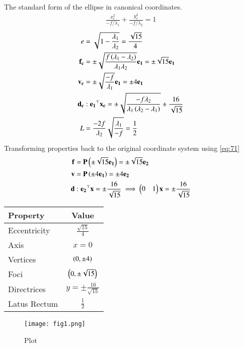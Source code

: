\documentclass[journal]{IEEEtran}
\begin{document}
The standard form of the ellipse in canonical coordinates.
\begin{align}
    \frac{x_c^2}{-f/\lambda_1} + \frac{y_c^2}{-f/\lambda_2} = 1
\end{align}
\begin{align}
    e &= \sqrt{1 - \frac{\lambda_1}{\lambda_2}} = \frac{\sqrt{15}}{4} \\
    \mathbf{f_c} &= \pm\sqrt{\frac{f\left(\lambda_1 - \lambda_2\right)}{\lambda_1\lambda_2}}\mathbf{e_1} = \pm\sqrt{15}\mathbf{e_1} \\
    \mathbf{v_c} &= \pm\sqrt{\frac{-f}{\lambda_1}}\mathbf{e_1} = \pm 4\mathbf{e_1} \\
    \mathbf{d_c} &: \mathbf{e_1}^\top\mathbf{x_c} = \pm\sqrt{\frac{-f\lambda_2}{\lambda_1\left(\lambda_2-\lambda_1\right)}} \pm\frac{16}{\sqrt{15}} \\
    L &= \frac{-2f}{\lambda_2}\sqrt{\frac{\lambda_1}{-f}} = \frac{1}{2}
\end{align}
Transforming properties back to the original coordinate system using \eqref{eq:71}
\begin{align}
    \mathbf{f} &= \mathbf{P}\left(\pm \sqrt{15}\mathbf{e_1}\right) = \pm \sqrt{15}\mathbf{e_2} \\
    \mathbf{v} &= \mathbf{P}\left(\pm 4\mathbf{e_1}\right) = \pm 4\mathbf{e_2} \\
    \mathbf{d} &: \mathbf{e_2}^\top\mathbf{x} = \pm \frac{16}{\sqrt{15}} \implies \begin{pmatrix}0 & 1\end{pmatrix}\mathbf{x} = \pm \frac{16}{\sqrt{15}}
\end{align}
\begin{center}
\begin{tabular}{|l|c|}
    \hline
    \textbf{Property} & \textbf{Value} \\
    \hline
    Eccentricity & $\frac{\sqrt{15}}{4}$ \\
    \hline
    Axis & $x=0$ \\
    \hline
    Vertices & $\left(0, \pm 4\right)$ \\
    \hline
    Foci & $\left(0, \pm \sqrt{15}\right)$ \\
    \hline
    Directrices & $y = \pm \frac{16}{\sqrt{15}}$ \\
    \hline
    Latus Rectum & $\frac{1}{2}$ \\
    \hline
\end{tabular}
\end{center}






\begin{figure}[H]
	\centering
	\texttt{[image: fig1.png]}
	\caption*{Plot}
	\label{fig:1}
\end{figure}
\end{document}
